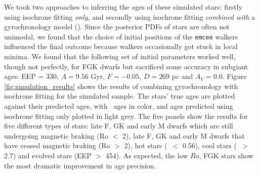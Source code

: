 We took two approaches to inferring the ages of these simulated stars:
firstly using isochrone fitting {\it only}, and secondly using isochrone
fitting {\it combined with} a gyrochronology model (\sd).
Since the posterior PDFs of stars are often not unimodal, we found that the
choice of initial positions of the {\tt emcee} walkers influenced the final
outcome because walkers occasionally got stuck in local minima.
We found that the following set of initial parameters worked well, though not
perfectly, for FGK dwarfs but sacrificed some accuracy in subgiant ages: EEP =
330, $A = 9.56$ Gyr, $F = -0.05$, $D = 269$ pc and $A_V = 0.0$.
Figure \ref{fig:simulation_results} shows the results of combining
gyrochronology with isochrone fitting for the simulated sample.
The stars' true ages are plotted against their predicted ages, with \sd\ ages
in color, and ages predicted using isochrone fitting only plotted in light
grey.
The five panels show the results for five different types of stars: late F, GK
and early M dwarfs which are still undergoing magnetic braking (Ro $<$ 2),
late F, GK and early M dwarfs that have ceased magnetic braking (Ro $>$ 2),
hot stars (\gcolor\ $<$ 0.56), cool stars (\gcolor\ $>$ 2.7) and evolved stars
(EEP $>$ 454).
As expected, the low $Ro$, FGK stars show the most dramatic improvement in age
precision.
